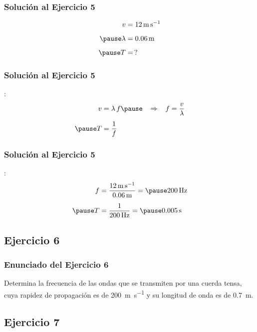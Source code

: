 \documentclass[14pt]{beamer}
\begin{document}
\begin{frame}
\frametitle{Solución al Ejercicio 5}
\pause
\begin{eqnarray*}
\begin{aligned}
v &= \SI{12}{\meter\per\second} \\[0.5em] \pause
\lambda &= \SI{0.06}{\meter} \\[0.5em] \pause
T &= \, ?
\end{aligned}
\end{eqnarray*}
\end{frame}
\begin{frame}
\frametitle{Solución al Ejercicio 5}
:
\pause
\begin{eqnarray*}
\begin{aligned}
v &= \lambda \, f \pause \hspace{0.3cm} \Rightarrow \hspace{0.3cm} f = \dfrac{v}{\lambda} \\[0.5em] \pause
T &= \dfrac{1}{f}
\end{aligned}
\end{eqnarray*}
\end{frame}
\begin{frame}
\frametitle{Solución al Ejercicio 5}
:
\pause
\begin{eqnarray*}
\begin{aligned}
f &= \dfrac{\SI{12}{\meter\per\second}}{\SI{0.06}{\meter}} = \pause \SI{200}{\hertz} \\[0.5em] \pause
T &= \dfrac{1}{\SI{200}{\hertz}} = \pause \SI{0.005}{\second}
\end{aligned}
\end{eqnarray*}
\end{frame}

\subsection{Ejercicio 6}

\begin{frame}
\frametitle{Enunciado del Ejercicio 6}
Determina la frecuencia de las ondas que se transmiten por una cuerda tensa, cuya rapidez de propagación es de \SI{200}{\meter\per\second} y su longitud de onda es de \SI{0.7}{\meter}.
\end{frame}

\subsection{Ejercicio 7}
\end{document}
